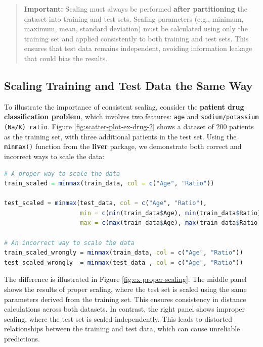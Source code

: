 \documentclass[
]{book}
\newcommand{\passthrough}[1]{#1}
\theoremstyle{definition}
\theoremstyle{definition}
\theoremstyle{definition}
\theoremstyle{definition}
\theoremstyle{remark}
\begin{document}
\begin{quote}
\textbf{Important:} Scaling must always be performed \textbf{after partitioning} the dataset into training and test sets. Scaling parameters (e.g., minimum, maximum, mean, standard deviation) must be calculated using only the training set and applied consistently to both training and test sets. This ensures that test data remains independent, avoiding information leakage that could bias the results.
\end{quote}

\subsection{Scaling Training and Test Data the Same Way}\label{scaling-training-and-test-data-the-same-way}

To illustrate the importance of consistent scaling, consider the \textbf{patient drug classification problem}, which involves two features: \passthrough{\lstinline!age!} and \passthrough{\lstinline!sodium/potassium (Na/K) ratio!}. Figure \ref{fig:scatter-plot-ex-drug-2} shows a dataset of 200 patients as the training set, with three additional patients in the test set. Using the \passthrough{\lstinline!minmax()!} function from the \textbf{liver} package, we demonstrate both correct and incorrect ways to scale the data:

\begin{lstlisting}[language=R]
# A proper way to scale the data
train_scaled = minmax(train_data, col = c("Age", "Ratio"))

test_scaled = minmax(test_data, col = c("Age", "Ratio"), 
                     min = c(min(train_data$Age), min(train_data$Ratio)), 
                     max = c(max(train_data$Age), max(train_data$Ratio)))

# An incorrect way to scale the data
train_scaled_wrongly = minmax(train_data, col = c("Age", "Ratio"))
test_scaled_wrongly  = minmax(test_data , col = c("Age", "Ratio"))
\end{lstlisting}

The difference is illustrated in Figure \ref{fig:ex-proper-scaling}. The middle panel shows the results of proper scaling, where the test set is scaled using the same parameters derived from the training set. This ensures consistency in distance calculations across both datasets. In contrast, the right panel shows improper scaling, where the test set is scaled independently. This leads to distorted relationships between the training and test data, which can cause unreliable predictions.
\end{document}
